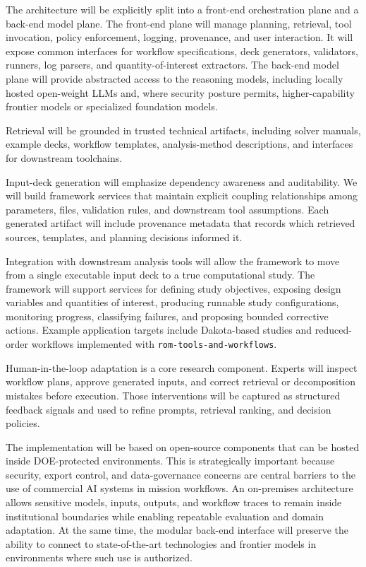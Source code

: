 \documentclass[11pt]{article} \usepackage[margin=1in]{geometry}
\begin{document}
The architecture will be explicitly split into a front-end orchestration plane
and a back-end model plane. The front-end plane will manage planning, retrieval,
tool invocation, policy enforcement, logging, provenance, and user interaction.
It will expose common interfaces for workflow specifications, deck generators,
validators, runners, log parsers, and quantity-of-interest extractors. The
back-end model plane will provide abstracted access to the reasoning models,
including locally hosted open-weight LLMs and, where security posture permits,
higher-capability frontier models or specialized foundation models.

Retrieval will be grounded in trusted technical artifacts, including solver
manuals, example decks, workflow templates, analysis-method descriptions, and
interfaces for downstream toolchains.

Input-deck generation will emphasize dependency awareness and auditability. We
will build framework services that maintain explicit coupling relationships
among parameters, files, validation rules, and downstream tool assumptions. Each
generated artifact will include provenance metadata that records which retrieved
sources, templates, and planning decisions informed it.

Integration with downstream analysis tools will allow the framework to move from
a single executable input deck to a true computational study. The framework will
support services for defining study objectives, exposing design variables and
quantities of interest, producing runnable study configurations, monitoring
progress, classifying failures, and proposing bounded corrective actions.
Example application targets include Dakota-based studies and reduced-order
workflows implemented with \texttt{rom-tools-and-workflows}.

Human-in-the-loop adaptation is a core research component. Experts will inspect
workflow plans, approve generated inputs, and correct retrieval or decomposition
mistakes before execution. Those interventions will be captured as structured
feedback signals and used to refine prompts, retrieval ranking, and decision
policies.

The implementation will be based on open-source components that can be hosted
inside DOE-protected environments. This is strategically important because
security, export control, and data-governance concerns are central barriers to
the use of commercial AI systems in mission workflows. An on-premises
architecture allows sensitive models, inputs, outputs, and workflow traces to
remain inside institutional boundaries while enabling repeatable evaluation and
domain adaptation. At the same time, the modular back-end interface will
preserve the ability to connect to state-of-the-art technologies and frontier
models in environments where such use is authorized.
\end{document}
